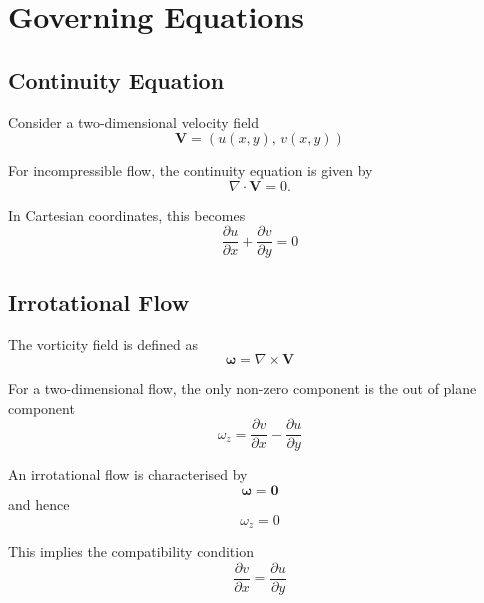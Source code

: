 \section{Governing Equations}
\label{sec:governing-equations}

\subsection{Continuity Equation}
\label{subsec:continuity-equation}

Consider a two-dimensional velocity field
\[
\mathbf{V} = (u(x, y),\, v(x, y))
\]

For incompressible flow, the continuity equation is given by
\[
\nabla \cdot \mathbf{V} = 0.
\]

In Cartesian coordinates, this becomes
\[
\frac{\partial u}{\partial x} + \frac{\partial v}{\partial y} = 0
\]


\subsection{Irrotational Flow}
\label{subsec:irrotational-flow}


The vorticity field is defined as
\[
\boldsymbol{\omega} = \nabla \times \mathbf{V}
\]

For a two-dimensional flow, the only non-zero component is the out of plane component
\[
\omega_z = \frac{\partial v}{\partial x} - \frac{\partial u}{\partial y}
\]

An irrotational flow is characterised by
\[
\boldsymbol{\omega} = \mathbf{0}
\]
and hence
\[
\omega_z = 0
\]

This implies the compatibility condition
\[
\frac{\partial v}{\partial x} = \frac{\partial u}{\partial y}
\]
